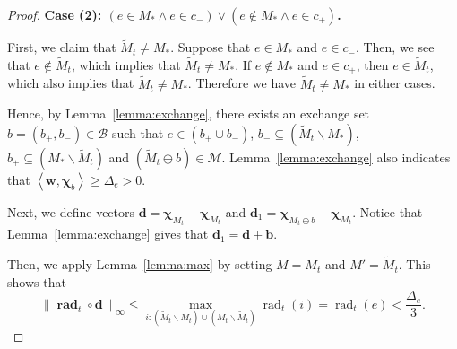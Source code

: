\documentclass{article}
\newcommand{\M}{\mathcal M}
\newcommand{\B}{\mathcal B}
\newcommand{\del}{\backslash}
\DeclareMathOperator{\rad}{rad}
\newcommand{\inn}[1]{\left\langle #1 \right\rangle}
\newcommand{\nor}[1]{\left\|#1\right\|}
\renewcommand{\vec}[1]{\boldsymbol{#1}}
\renewcommand{\odot}{\circ}
\begin{document}
\begin{spacing}{1.1}
\begin{proof}
\textbf{Case (2): $(e \in M_* \wedge e\in c_-) \vee (e \not \in M_* \wedge e\in c_+)$.}

First, we claim that $\tilde M_t \not= M_*$.
Suppose that $e\in M_*$ and $e\in c_-$.
Then, we see that $e\not\in \tilde M_t$, which implies that $\tilde M_t\not=M_*$.
If $e\not \in M_*$ and $e\in c_+$, then $e\in \tilde M_t$, which also implies that $\tilde M_t\not= M_*$.
Therefore we have $\tilde M_t\not=M_*$ in either cases.


Hence, by Lemma~\ref{lemma:exchange}, there exists an exchange set $b=(b_+,b_-)\in \B$ such that 
$e \in (b_+ \cup b_-)$, $b_-\subseteq  (\tilde M_t \del M_*)$, $b_+ \subseteq (M_* \del \tilde M_t)$ and
$(\tilde M_t \oplus b) \in \M$.
Lemma~\ref{lemma:exchange} also indicates that $\inn{\vec w, \vec \chi_b} \ge \Delta_e > 0$.

Next, we define vectors $\vec d = \vec \chi_{\tilde M_t} - \vec \chi_{M_t}$ and $\vec d_1 = \vec\chi_{\tilde M_t\oplus b}-\vec\chi_{M_t}$.
Notice that Lemma~\ref{lemma:exchange} gives that $\vec d_1= \vec d+\vec b$.

Then, we apply Lemma~\ref{lemma:max} by setting $M = M_t$ and $M' = \tilde M_t$. 
This shows that 
\begin{equation}
\nor{\vec \rad_t\odot \vec d}_\infty \le \max_{i: (\tilde M_t \del M_t)\cup (M_t\del \tilde M_t)} \rad_t(i) = \rad_t(e) < \frac{\Delta_e}{3}.
\label{eq:u-c-2-0}
\end{equation}


\end{proof}
\end{spacing}
\end{document}
